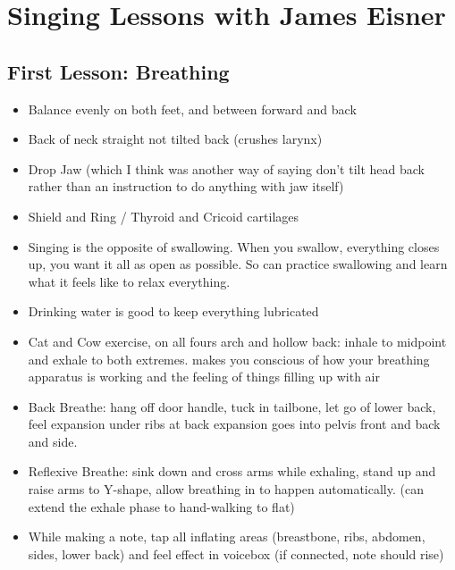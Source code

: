 \documentclass[14pt,a4paper]{memoir}
\begin{document}
\chapter*{Singing Lessons with James Eisner}

\section*{First Lesson: Breathing}

\begin{itemize}
\item Balance evenly on both feet, and between forward and back

\item Back of neck straight not tilted back (crushes larynx)

\item Drop Jaw (which I think was another way of saying don't tilt head back rather than an instruction to do anything with jaw itself)

\item Shield and Ring / Thyroid and Cricoid cartilages

\item Singing is the opposite of swallowing. When you swallow, everything closes up, you want it all as open as possible.
So can practice swallowing and learn what it feels like to relax everything.

\item Drinking water is good to keep everything lubricated

\item Cat and Cow exercise, on all fours arch and hollow back: inhale to midpoint and exhale to both extremes.
makes you conscious of how your breathing apparatus is working and the feeling of things filling up with air

\item Back Breathe: hang off door handle, tuck in tailbone, let go of lower back, feel expansion under ribs at back
expansion goes into pelvis front and back and side. 

\item Reflexive Breathe: sink down and cross arms while exhaling, stand up and raise arms to Y-shape, allow breathing in to happen automatically. (can extend the exhale phase to hand-walking to flat)
  
\item While making a note, tap all inflating areas (breastbone, ribs, abdomen, sides, lower back) and feel effect in voicebox (if connected, note should rise)
  

\end{itemize}
\end{document}

